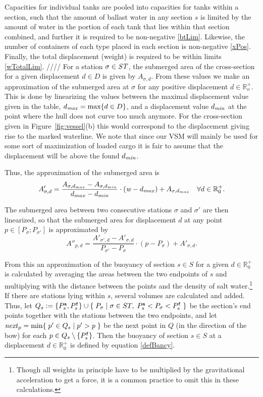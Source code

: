 Capacities for individual tanks are pooled into capacities for tanks within a section, such that the amount of ballast water in any section $s$ is limited by the amount of water in the portion of each tank that lies within that section combined, and further it is required to be non-negative \eqref{btLim}. 
Likewise, the number of containers of each type placed in each section is non-negative \eqref{xPos}. Finally, the total displacement (weight) is required to be within limits \eqref{wTotalLim}.
////
For a station $\sigma\in\mathit{ST}$, the submerged area of the cross-section for a given displacement $d\in D$ is given by $A_{\sigma,d}$. From these values we make an approximation of the submerged area at $\sigma$ for any positive displacement $d\in \mathbb{R}_o^+$. This is done by linearizing the values between the maximal displacement value given in the table, $d_\mathit{max}=\text{max}\{d\in D\}$, and a displacement value $d_\mathit{min}$ at the point where the hull does not curve too much anymore. For the cross-section given in Figure~\ref{fig:vessel}(b) this would correspond to the displacement giving rise to the marked waterline. We note that since our VSM will mainly be used for some sort of maximization of loaded cargo it is fair to assume that the displacement will be above the found $d_\mathit{min}$.

Thus, the approximation of the submerged area is  
\[
A'_{\sigma,d} = \frac{A_{\sigma,d_{max}} - A_{\sigma,d_{min}}}{d_{max} - d_{min}} \cdot (\mathit{w} - d_{max}) + A_{\sigma,d_{max}} \quad \forall d\in \mathbb{R}^+_0.
\]

The submerged area between two consecutive stations $\sigma$ and $\sigma'$ are then linearized, so that the submerged area for displacement $d$ at any point $p\in[P_\sigma;P_{\sigma'}]$ %
is approximated by
\[
A''_{p,d} = \frac{A'_{\sigma',d}-A'_{\sigma,d}}{P_{\sigma'}-P_\sigma}\cdot(p-P_\sigma) + A'_{\sigma,d}.
\]

From this an approximation of the buoyancy of section $s\in S$ for a given $d\in \mathbb{R}^+_0$ is calculated by averaging the areas between the two endpoints of $s$ and multiplying with the distance between the points and the density of salt water.\footnote{Though all weights in principle have to be multiplied by the gravitational acceleration to get a force, it is a common practice to omit this in these calculations.} If there are stations lying within $s$, several volumes are calculated and added.
Thus, let $Q_s := \{P^{\texttt{a}}_s, P^{\texttt{f}}_s\} \cup \{\;{P_\sigma}\;|\;{\sigma\in ST,\; P^{\texttt{a}}_s < P_\sigma < P^{\texttt{f}}_s}\;\}$ be the section's end points together with the stations between the two endpoints, and let $\mathit{next}_p = \min\{\;{p' \in Q_s}\;|\;{p' > p}\;\}$ be the next point in $Q$ (in the direction of the bow) for each $p \in Q_s\setminus \{P^{\texttt{f}}_s\}$. Then the buoyancy of section $s\in S$ at a displacement $d\in\mathbb{R}^+_0$ is defined by equation \eqref{defBancy}. 

